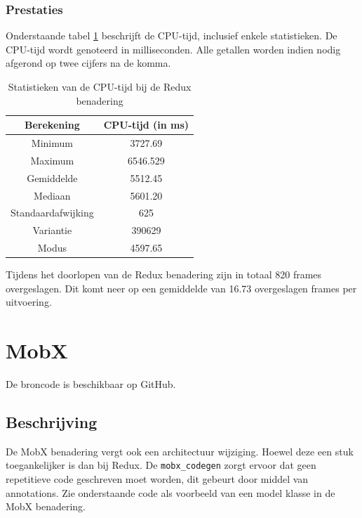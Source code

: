 \subsubsection{Prestaties}
Onderstaande tabel \ref{table:experiment-redux-statistics} beschrijft de CPU-tijd, inclusief enkele statistieken. De CPU-tijd wordt genoteerd in milliseconden. Alle getallen worden indien nodig afgerond op twee cijfers na de komma.
\begin{table}[H]
    \centering
    \begin{tabular}{c|c}
        \textbf{Berekening} & \textbf{CPU-tijd (in ms)} \\ \hline
        Minimum             & 3727.69                   \\ \hline
        Maximum             & 6546.529                  \\ \hline
        Gemiddelde          & 5512.45                   \\ \hline
        Mediaan             & 5601.20                   \\ \hline
        Standaardafwijking  & 625                       \\ \hline
        Variantie           & 390629                    \\ \hline
        Modus               & 4597.65                      \\                
    \end{tabular}
    \caption{Statistieken van de CPU-tijd bij de Redux benadering}
    \label{table:experiment-redux-statistics}
\end{table}

Tijdens het doorlopen van de Redux benadering zijn in totaal 820 frames overgeslagen. Dit komt neer op een gemiddelde van 16.73 overgeslagen frames per uitvoering.

\section{MobX}
De broncode is beschikbaar op GitHub. \autocite{DeVrient2019e}
\subsection{Beschrijving}
De MobX benadering vergt ook een architectuur wijziging. Hoewel deze een stuk toegankelijker is dan bij Redux. De \verb|mobx_codegen| zorgt ervoor dat geen repetitieve code geschreven moet worden, dit gebeurt door middel van annotations. Zie onderstaande code als voorbeeld van een model klasse in de MobX benadering.

